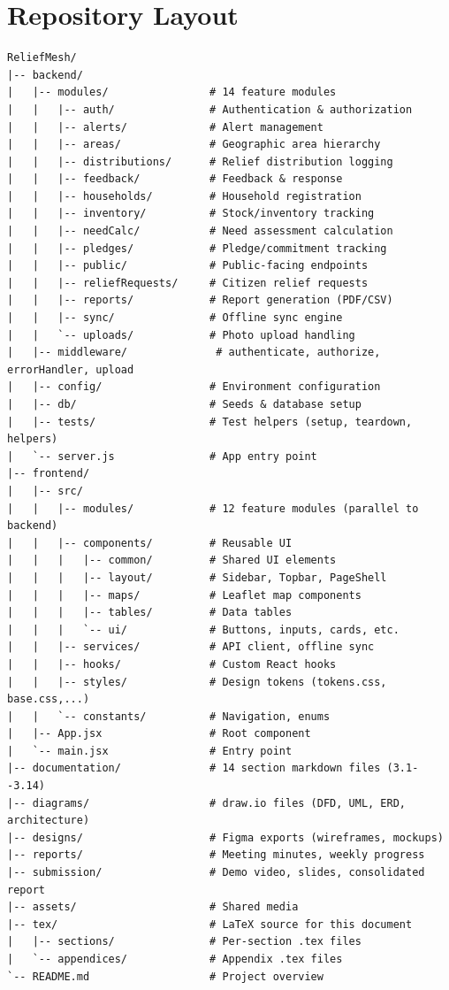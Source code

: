 
\section{Repository Layout}
\begin{verbatim}
ReliefMesh/
|-- backend/
|   |-- modules/                # 14 feature modules
|   |   |-- auth/               # Authentication & authorization
|   |   |-- alerts/             # Alert management
|   |   |-- areas/              # Geographic area hierarchy
|   |   |-- distributions/      # Relief distribution logging
|   |   |-- feedback/           # Feedback & response
|   |   |-- households/         # Household registration
|   |   |-- inventory/          # Stock/inventory tracking
|   |   |-- needCalc/           # Need assessment calculation
|   |   |-- pledges/            # Pledge/commitment tracking
|   |   |-- public/             # Public-facing endpoints
|   |   |-- reliefRequests/     # Citizen relief requests
|   |   |-- reports/            # Report generation (PDF/CSV)
|   |   |-- sync/               # Offline sync engine
|   |   `-- uploads/            # Photo upload handling
|   |-- middleware/              # authenticate, authorize, errorHandler, upload
|   |-- config/                 # Environment configuration
|   |-- db/                     # Seeds & database setup
|   |-- tests/                  # Test helpers (setup, teardown, helpers)
|   `-- server.js               # App entry point
|-- frontend/
|   |-- src/
|   |   |-- modules/            # 12 feature modules (parallel to backend)
|   |   |-- components/         # Reusable UI
|   |   |   |-- common/         # Shared UI elements
|   |   |   |-- layout/         # Sidebar, Topbar, PageShell
|   |   |   |-- maps/           # Leaflet map components
|   |   |   |-- tables/         # Data tables
|   |   |   `-- ui/             # Buttons, inputs, cards, etc.
|   |   |-- services/           # API client, offline sync
|   |   |-- hooks/              # Custom React hooks
|   |   |-- styles/             # Design tokens (tokens.css, base.css,...)
|   |   `-- constants/          # Navigation, enums
|   |-- App.jsx                 # Root component
|   `-- main.jsx                # Entry point
|-- documentation/              # 14 section markdown files (3.1--3.14)
|-- diagrams/                   # draw.io files (DFD, UML, ERD, architecture)
|-- designs/                    # Figma exports (wireframes, mockups)
|-- reports/                    # Meeting minutes, weekly progress
|-- submission/                 # Demo video, slides, consolidated report
|-- assets/                     # Shared media
|-- tex/                        # LaTeX source for this document
|   |-- sections/               # Per-section .tex files
|   `-- appendices/             # Appendix .tex files
`-- README.md                   # Project overview
\end{verbatim}
